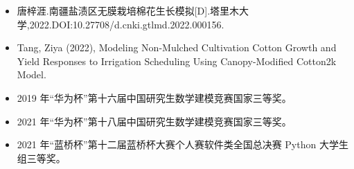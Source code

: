 \documentclass[zh]{resume}
\begin{document}


\begin{itemize}
  \item 唐梓涯.南疆盐渍区无膜栽培棉花生长模拟[D].塔里木大学,2022.DOI:10.27708/d.cnki.gtlmd.2022.000156.
  \item Tang, Ziya (2022), Modeling Non-Mulched Cultivation Cotton Growth and Yield Responses to Irrigation Scheduling Using Canopy-Modified Cotton2k Model.
\end{itemize}

\begin{itemize}
  \item 2019 年“华为杯”第十六届中国研究生数学建模竞赛国家三等奖。
  \item 2021 年“华为杯”第十八届中国研究生数学建模竞赛国家三等奖。
  \item 2021 年“蓝桥杯”第十二届蓝桥杯大赛个人赛软件类全国总决赛 Python 大学生组三等奖。
\end{itemize}
\end{document}
